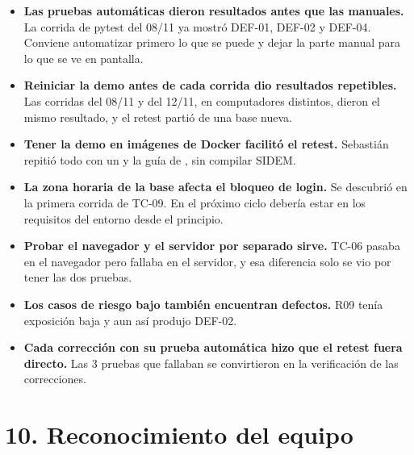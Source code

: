 \documentclass[11pt,a4paper,oneside]{report}
\newcommand{\code}[1]{\leavevmode{\ttfamily\color{tinta}#1}}
\begin{document}
\begin{itemize}
\item \textbf{Las pruebas automáticas dieron resultados antes que las manuales.} La corrida de pytest del 08/11 ya mostró DEF-01, DEF-02 y DEF-04. Conviene automatizar primero lo que se puede y dejar la parte manual para lo que se ve en pantalla.
\item \textbf{Reiniciar la demo antes de cada corrida dio resultados repetibles.} Las corridas del 08/11 y del 12/11, en computadores distintos, dieron el mismo resultado, y el retest partió de una base nueva.
\item \textbf{Tener la demo en imágenes de Docker facilitó el retest.} Sebastián repitió todo con un \code{docker load} y la guía de \code{retest.\allowbreak{}md}, sin compilar SIDEM.
\item \textbf{La zona horaria de la base afecta el bloqueo de login.} Se descubrió en la primera corrida de TC-09. En el próximo ciclo debería estar en los requisitos del entorno desde el principio.
\item \textbf{Probar el navegador y el servidor por separado sirve.} TC-06 pasaba en el navegador pero fallaba en el servidor, y esa diferencia solo se vio por tener las dos pruebas.
\item \textbf{Los casos de riesgo bajo también encuentran defectos.} R09 tenía exposición baja y aun así produjo DEF-02.
\item \textbf{Cada corrección con su prueba automática hizo que el retest fuera directo.} Las 3 pruebas que fallaban se convirtieron en la verificación de las correcciones.
\end{itemize}

\Needspace{150pt}\section*{10. Reconocimiento del equipo}
\end{document}
